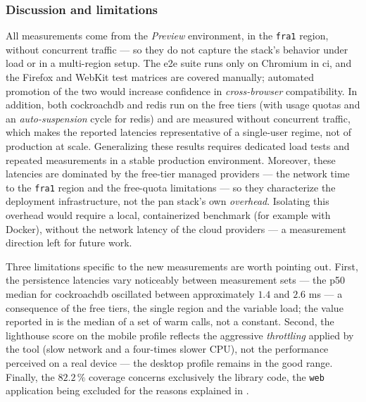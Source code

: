 \subsubsection{Discussion and limitations}\label{subsec:discutie-limitari}

All measurements come from the \textit{Preview} environment, in the \texttt{fra1} region, without concurrent traffic --- so they do not capture the stack's behavior under load or in a multi-region setup. The \acrshort{e2e} suite runs only on Chromium in \acrshort{ci}, and the Firefox and WebKit test matrices are covered manually; automated promotion of the two would increase confidence in \textit{cross-browser} compatibility. In addition, both \gls{cockroachdb} and \gls{redis} run on the free tiers (with usage quotas and an \textit{auto-suspension} cycle for \gls{redis}) and are measured without concurrent traffic, which makes the reported latencies representative of a single-user regime, not of production at scale. Generalizing these results requires dedicated load tests and repeated measurements in a stable production environment. Moreover, these latencies are dominated by the free-tier managed providers --- the network time to the \texttt{fra1} region and the free-quota limitations --- so they characterize the deployment infrastructure, not the \gls{pan} stack's own \textit{overhead}. Isolating this overhead would require a local, containerized benchmark (for example with Docker), without the network latency of the cloud providers --- a measurement direction left for future work.

Three limitations specific to the new measurements are worth pointing out. First, the persistence latencies vary noticeably between measurement sets --- the \acrshort{p50} median for \gls{cockroachdb} oscillated between approximately \(1.4\) and \(2.6\) ms --- a consequence of the free tiers, the single region and the variable load; the value reported in  is the median of a set of warm calls, not a constant. Second, the \gls{lighthouse} score on the mobile profile reflects the aggressive \textit{throttling} applied by the tool (slow network and a four-times slower CPU), not the performance perceived on a real device --- the desktop profile remains in the good range. Finally, the \(82.2\,\%\) coverage concerns exclusively the library code, the \texttt{web} application being excluded for the reasons explained in .
